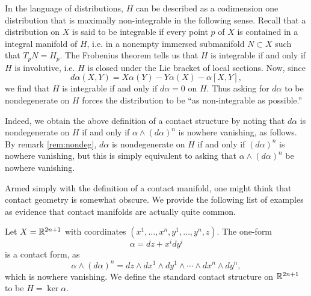 \documentclass{amsart}
\begin{document}
\begin{remark}
    In the language of distributions, $H$ can be described as a codimension one
    distribution that is maximally non-integrable in the following sense. Recall
    that a distribution on $X$ is said to be integrable if every point $p$ of $X$ is
    contained in a integral manifold of $H$, i.e. in a nonempty immersed submanifold
    $N\subset X$ such that $T_pN=H_p$. The Frobenius theorem tells us that $H$ is
    integrable if and only if $H$ is involutive, i.e. $H$ is closed under the Lie
    bracket of local sections. Now, since
    \begin{equation*}
        d\alpha(X,Y) = X\alpha(Y)-Y\alpha(X)-\alpha[X,Y],
    \end{equation*}
    we find that $H$ is integrable if and only if $d\alpha=0$ on $H$. Thus asking for
    $d\alpha$ to be nondegenerate on $H$ forces the distribution to be ``as non-integrable
    as possible.''
    
    Indeed, we obtain the above definition of a contact structure by
    noting that $d\alpha$ is nondegenerate on $H$ if and only if $\alpha\wedge(d\alpha)^n$
    is nowhere vanishing, as follows. By remark \ref{rem:nondeg}, $d\alpha$ is nondegenerate
    on $H$ if and only if $(d\alpha)^n$ is nowhere vanishing, but this is simply
    equivalent to asking that $\alpha\wedge(d\alpha)^n$ be nowhere vanishing.
\end{remark}

Armed simply with the definition of a contact manifold, one might think that contact
geometry is somewhat obscure. We provide the following list of examples as evidence
that contact manifolds are actually quite common.

\begin{example}
    Let $X=\mathbb{R}^{2n+1}$ with coordinates $(x^1,\ldots,x^n,y^1,\ldots,y^n,z)$. The
    one-form
    \begin{equation*}
        \alpha = dz + x^i dy^i
    \end{equation*}
    is a contact form, as
    \begin{equation*}
        \alpha\wedge(d\alpha)^n = dz\wedge dx^1\wedge dy^1\wedge\cdots\wedge dx^n\wedge dy^n,
    \end{equation*}
    which is nowhere vanishing. We define the standard contact structure on $\mathbb{R}^{2n+1}$
    to be $H=\ker\alpha$.
\end{example}
\end{document}
